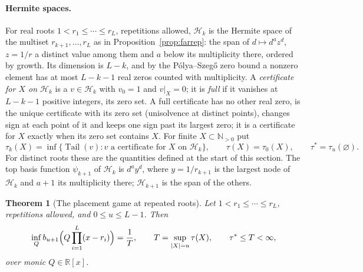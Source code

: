 \documentclass[11pt]{article}
\newtheorem{theorem}{Theorem}[section]
\theoremstyle{definition}
\theoremstyle{plain}
\newcommand{\R}{\mathbb R}
\newcommand{\N}{\mathbb N}
\DeclareMathOperator{\Tail}{Tail}
\begin{document}
\paragraph{Hermite spaces.}  For real roots
$1<r_1\le\cdots\le r_L$, repetitions allowed, $\mathcal H_k$ is the Hermite
space of the multiset $r_{k+1},\ldots,r_L$ as in
Proposition~\ref{prop:farrep}: the span of $d\mapsto d^az^d$, $z=1/r$ a
distinct value among them and $a$ below its multiplicity there, ordered by
growth.  Its dimension is $L-k$, and by the P\'olya--Szeg\H o zero bound a
nonzero element has at most $L-k-1$ real zeros counted with multiplicity.
A \emph{certificate for $X$ on $\mathcal H_k$} is a $v\in\mathcal H_k$ with
$v_0=1$ and $v|_X=0$; it is \emph{full} if it vanishes at $L-k-1$ positive
integers, its zero set.  A full certificate has no other real zero, is the
unique certificate with its zero set (unisolvence at distinct points),
changes sign at each point of it and keeps one sign past its largest zero; it
is a certificate for $X$ exactly when its zero set contains $X$.  For finite $X\subset\N_{>0}$ put
\[
  \tau_k(X)=\inf\{\Tail(v):v\text{ a certificate for }X\text{ on }\mathcal H_k\},
  \qquad \tau(X)=\tau_0(X),\qquad \tau^*=\tau_u(\varnothing).
\]
For distinct roots these are the quantities defined at the start of this section.  The top basis function $\psi_{k+1}$ of $\mathcal H_k$ is
$d^ay^d$, where $y=1/r_{k+1}$ is the largest node of $\mathcal H_k$ and
$a+1$ its multiplicity there; $\mathcal H_{k+1}$ is the span of the others.

\begin{theorem}[The placement game at repeated roots]\label{thm:valuerep}
Let $1<r_1\le\cdots\le r_L$, repetitions allowed, and $0\le u\le L-1$.  Then
\[
  \inf_Qb_{u+1}\Bigl(Q\prod_{i=1}^L(x-r_i)\Bigr)=\frac1T,
  \qquad T=\sup_{|X|=u}\tau(X),\qquad \tau^*\le T<\infty,
\]
over monic $Q\in\R[x]$.
\end{theorem}
\end{document}
